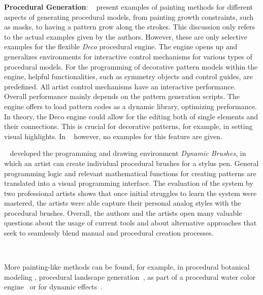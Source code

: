 \textbf{Procedural Generation}:\label{subsubpara:analysis_rulebased_sketchbased_procedural}
\citeauthor*{mech_2012_tdf}~\cite{mech_2012_tdf} present examples of painting methods for different aspects of generating procedural models, from painting growth constraints, such as masks, to having a pattern grow along the strokes. This discussion only refers to the actual examples given by the authors. However, these are only selective examples for the flexible \textit{Deco} procedural engine. The engine opens up and generalizes environments for interactive control mechanisms for various types of procedural models. For the programming of decorative pattern models within the engine, helpful functionalities, such as symmetry objects and control guides, are predefined. All artist control mechanisms have an interactive performance. Overall performance mainly depends on the pattern generation scripts. The engine offers to load pattern codes as a dynamic library, optimizing performance. In theory, the Deco engine could allow for the editing both of single elements and their connections. This is crucial for decorative patterns, for example, in setting visual highlights. In \citeauthor*{mech_2012_tdf}~\cite{mech_2012_tdf} however, no examples for this feature are given. 

\citeauthor*{jacobs_2018_dbe}~\cite{jacobs_2018_dbe} developed the programming and drawing environment \textit{Dynamic Brushes}, in which an artist can create individual procedural brushes for a stylus pen. General programming logic and relevant mathematical functions for creating patterns are translated into a visual programming interface. The evaluation of the system by two professional artists shows that once initial struggles to learn the system were mastered, the artists were able capture their personal analog styles with the procedural brushes. Overall, the authors and the artists open many valuable questions about the usage of current tools and about alternative approaches that seek to seamlessly blend manual and procedural creation processes.


\citeauthor*{gieseke_2017_ooo}~\cite{gieseke_2017_ooo}


More painting-like methods can be found, for example, in procedural botanical modeling \cite{anastacio_2008_spl,chen_2008_stm,palubicki_2009_sot}, procedural landscape generation~\cite{emilien_2015_wie}, as part of a procedural water color engine~\cite{diverdi_2013_ppp} or for dynamic effects~\cite{xing_2016_eit}. 




